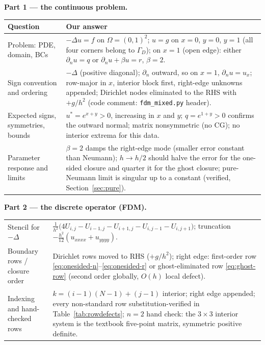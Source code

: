 \documentclass[11pt,a4paper]{article}
\begin{document}
\medskip
\textbf{Part 1 --- the continuous problem.}
\begin{center}\small
\begin{tabular}{@{}p{5.2cm}p{9.2cm}@{}}
\toprule
\textbf{Question} & \textbf{Our answer} \\
\midrule
Problem: PDE, domain, BCs &
$-\Delta u = f$ on $\Omega = (0,1)^2$; $u = g$ on $x = 0$, $y = 0$,
$y = 1$ (all four corners belong to $\Gamma_D$); on $x = 1$ (open edge):
either $\partial_n u = q$ or $\partial_n u + \beta u = r$, $\beta = 2$. \\
Sign convention and ordering &
$-\Delta$ (positive diagonal); $\partial_n$ outward, so on $x = 1$,
$\partial_n u = u_x$; row-major in $x$, interior block first, right-edge
unknowns appended; Dirichlet nodes eliminated to the RHS with $+g/h^2$
(code comment: \texttt{fdm\_mixed.py} header). \\
Expected signs, symmetries, bounds &
$u^* = e^{x+y} > 0$, increasing in $x$ and $y$; $q = e^{1+y} > 0$
confirms the outward normal; matrix nonsymmetric (no CG); no interior
extrema for this data. \\
Parameter response and limits &
$\beta = 2$ damps the right-edge mode (smaller error constant than
Neumann); $h \to h/2$ should halve the error for the one-sided closure
and quarter it for the ghost closure; pure-Neumann limit is singular up
to a constant (verified, Section~\ref{sec:pure}). \\
\bottomrule
\end{tabular}
\end{center}

\textbf{Part 2 --- the discrete operator (FDM).}
\begin{center}\small
\begin{tabular}{@{}p{5.2cm}p{9.2cm}@{}}
\toprule
Stencil for $-\Delta$ &
$\frac{1}{h^2}\big(4U_{i,j} - U_{i-1,j} - U_{i+1,j} - U_{i,j-1} -
U_{i,j+1}\big)$; truncation $-\frac{h^2}{12}(u_{xxxx}+u_{yyyy})$. \\
Boundary rows / closure order &
Dirichlet rows moved to RHS ($+g/h^2$); right edge: first-order row
\eqref{eq:onesided-n}--\eqref{eq:onesided-r} or ghost-eliminated row
\eqref{eq:ghost-row} (second order globally, $O(h)$ local defect). \\
Indexing and hand-checked rows &
$ k = (i-1)(N-1)+(j-1)$ interior; right edge appended; every non-standard
row substitution-verified in Table~\ref{tab:rowdefects}; $n = 2$ hand
check: the $3\times 3$ interior system is the textbook five-point matrix,
symmetric positive definite. \\
\bottomrule
\end{tabular}
\end{center}
\end{document}
